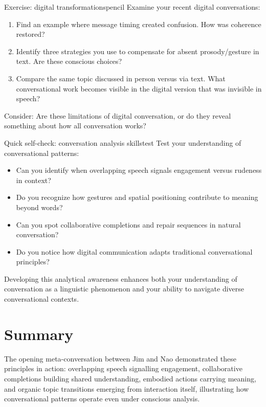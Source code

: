 \begin{tblsframedsymbol}{Exercise: digital transformations}{pencil}
Examine your recent digital conversations:
\begin{enumerate}[noitemsep, leftmargin=*]
    \item Find an example where message timing created confusion. How was coherence restored?
    \item Identify three strategies you use to compensate for absent prosody/gesture in text. Are these conscious choices?
    \item Compare the same topic discussed in person versus via text. What conversational work becomes visible in the digital version that was invisible in speech?
\end{enumerate}
Consider: Are these limitations of digital conversation, or do they reveal something about how all conversation works?
\end{tblsframedsymbol}

\begin{tblsframedsymbol}{Quick self-check: conversation analysis skills}{test}
Test your understanding of conversational patterns:
\begin{itemize}[noitemsep, leftmargin=*]
    \item Can you identify when overlapping speech signals engagement versus rudeness in context?
    \item Do you recognize how gestures and spatial positioning contribute to meaning beyond words?
    \item Can you spot collaborative completions and repair sequences in natural conversation?
    \item Do you notice how digital communication adapts traditional conversational principles?
\end{itemize}
Developing this analytical awareness enhances both your understanding of conversation as a linguistic phenomenon and your ability to navigate diverse conversational contexts.
\end{tblsframedsymbol}

\section{Summary}

The opening meta-conversation between Jim and Nao demonstrated these principles in action: overlapping speech signalling engagement, collaborative completions building shared understanding, embodied actions carrying meaning, and organic topic transitions emerging from interaction itself, illustrating how conversational patterns operate even under conscious analysis.

